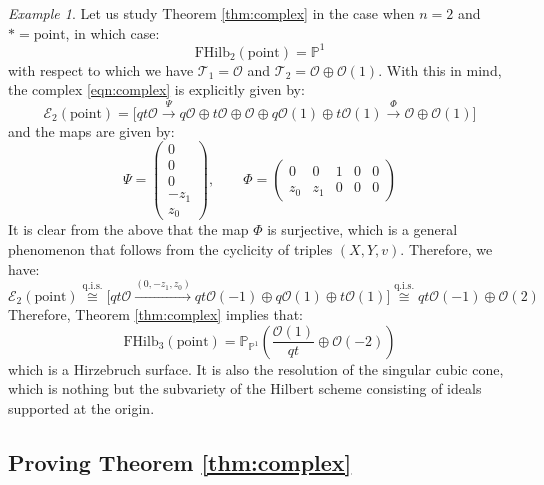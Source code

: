 \documentclass[12pt]{amsart}
\numberwithin{equation}{section}
\theoremstyle{definition}
\theoremstyle{remark}
\newtheorem{example}[theorem]{Example}
\newcommand{\PP}{\mathbb{P}}
\newcommand{\CE}{\mathcal{E}}
\newcommand{\CO}{\mathcal{O}}
\newcommand{\CT}{\mathcal{T}}
\renewcommand{\1}{\mathbf{1}}
\newcommand{\FH}{\mathrm{FHilb}}
\newcommand{\point}{\mathrm{point}}
\begin{document}
\begin{example}
\label{ex:n=2}
Let us study Theorem \ref{thm:complex} in the case when $n=2$ and $* = \point$, in which case:
$$
\FH_2(\point) = \PP^1
$$
with respect to which we have $\CT_1 = \CO$ and $\CT_2 = \CO \oplus \CO(1)$. With this in mind, the complex \eqref{eqn:complex} is explicitly given by:
$$
\CE_2(\point) = \Big[ qt\CO \stackrel{\Psi}\longrightarrow q\CO \oplus t \CO \oplus \CO \oplus q \CO(1) \oplus t\CO(1) \stackrel{\Phi}\longrightarrow \CO \oplus \CO(1) \Big]
$$
and the maps are given by:
$$
\Psi = \left( \begin{array}{c}
0 \\ 0 \\ 0 \\ -z_1 \\ z_0 \end{array} \right), \qquad \Phi = \left( \begin{array}{ccccc}
0 & 0 & 1 & 0 & 0 \\
z_0 & z_1 & 0 & 0 & 0 \end{array} \right)
$$
It is clear from the above that the map $\Phi$ is surjective, which is a general phenomenon that follows from the cyclicity of triples $(X,Y,v)$. Therefore, we have:
$$
\CE_2(\point) \stackrel{\text{q.i.s.}}\cong \Big[ qt\CO \xrightarrow{(0,-z_1,z_0)} qt \CO(-1) \oplus  q \CO(1) \oplus t\CO(1) \Big] \stackrel{\text{q.i.s.}}\cong qt\CO(-1) \oplus \CO(2)
$$
Therefore, Theorem \ref{thm:complex} implies that:
\begin{equation}
\label{eqn:pt 3}
\FH_3(\point) = \PP_{\PP^1} \left( \frac {\CO(1)}{qt} \oplus \CO(-2) \right)
\end{equation}
which is a Hirzebruch surface. It is also the resolution of the singular cubic cone, which is nothing but the subvariety of the Hilbert scheme consisting of ideals supported at the origin.

\end{example}

\subsection{Proving Theorem \ref{thm:complex}}
\label{sub:proofcomplex}
\end{document}
